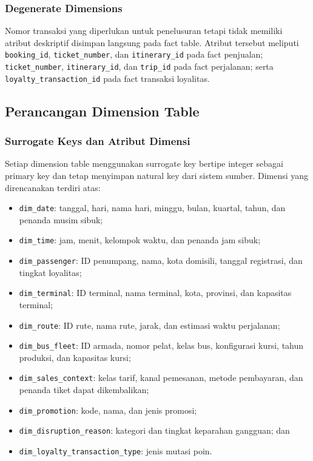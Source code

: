 \subsubsection{Degenerate Dimensions}

Nomor transaksi yang diperlukan untuk penelusuran tetapi tidak memiliki atribut
deskriptif disimpan langsung pada fact table. Atribut tersebut meliputi
\texttt{booking\_id}, \texttt{ticket\_number}, dan \texttt{itinerary\_id} pada
fact penjualan; \texttt{ticket\_number}, \texttt{itinerary\_id}, dan
\texttt{trip\_id} pada fact perjalanan; serta
\texttt{loyalty\_transaction\_id} pada fact transaksi loyalitas.

\subsection{Perancangan Dimension Table}
\subsubsection{Surrogate Keys dan Atribut Dimensi}

Setiap dimension table menggunakan surrogate key bertipe integer sebagai primary
key dan tetap menyimpan natural key dari sistem sumber. Dimensi yang direncanakan
terdiri atas:

\begin{itemize}[leftmargin=*, topsep=0pt]
    \item \texttt{dim\_date}: tanggal, hari, nama hari, minggu, bulan, kuartal,
    tahun, dan penanda musim sibuk;
    \item \texttt{dim\_time}: jam, menit, kelompok waktu, dan penanda jam sibuk;
    \item \texttt{dim\_passenger}: ID penumpang, nama, kota domisili, tanggal
    registrasi, dan tingkat loyalitas;
    \item \texttt{dim\_terminal}: ID terminal, nama terminal, kota, provinsi, dan
    kapasitas terminal;
    \item \texttt{dim\_route}: ID rute, nama rute, jarak, dan estimasi waktu
    perjalanan;
    \item \texttt{dim\_bus\_fleet}: ID armada, nomor pelat, kelas bus, konfigurasi
    kursi, tahun produksi, dan kapasitas kursi;
    \item \texttt{dim\_sales\_context}: kelas tarif, kanal pemesanan, metode
    pembayaran, dan penanda tiket dapat dikembalikan;
    \item \texttt{dim\_promotion}: kode, nama, dan jenis promosi;
    \item \texttt{dim\_disruption\_reason}: kategori dan tingkat keparahan
    gangguan; dan
    \item \texttt{dim\_loyalty\_transaction\_type}: jenis mutasi poin.
\end{itemize}

